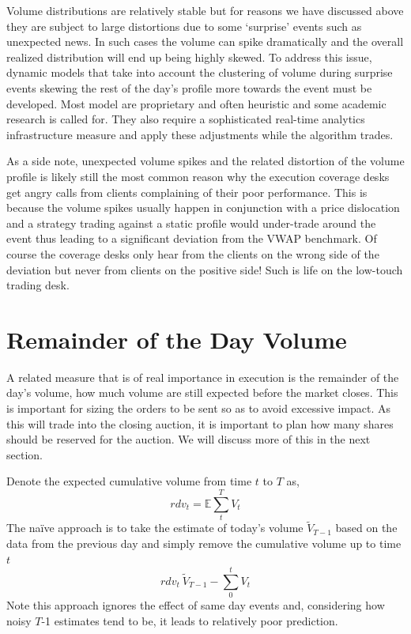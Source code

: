 Volume distributions are relatively stable but for reasons we have discussed above they are subject to large distortions due to some `surprise' events such as unexpected news. In such cases the volume can spike dramatically and the overall realized distribution will end up being highly skewed.  To address this issue, dynamic models that take into account the clustering of volume during surprise events skewing the rest of the day's profile more towards the event must be developed. Most model are proprietary and often heuristic and some academic research is called for. They also require a sophisticated real-time analytics infrastructure measure and apply these adjustments while the algorithm trades.


As a side note, unexpected volume spikes and the related distortion of the volume profile is likely still the most common reason why the execution coverage desks get angry calls from clients complaining of their poor performance. This is because the volume spikes usually happen in conjunction with a price dislocation and a strategy trading against a static profile would under-trade around the event thus leading to a significant deviation from the VWAP benchmark. Of course the coverage desks only hear from the clients on the wrong side of the deviation but never from clients on the positive side! Such is life on the low-touch trading desk.


\section{Remainder of the Day Volume}

A related measure that is of real importance in execution is the remainder of the day's volume, how much volume are still expected before the market closes. This is important for sizing the orders to be sent so as to avoid excessive impact. As this will trade into the closing auction, it is important to plan how many shares should be reserved for the auction. We will discuss more of this in the next section.


Denote the expected cumulative volume from time $t$ to $T$ as,
	\begin{equation}\label{eq:rdv_1}
		rdv_t = \mathbb{E} \sum_t^T V_t
	\end{equation}
The na\"ive approach is to take the estimate of today's volume $\tilde{V}_{T-1}$  based on the data from the previous day and simply remove the cumulative volume up to time $t$
	\begin{equation}\label{eq:rdv_2}
		rdv_t ~   \tilde{V}_{T-1} - \sum_0^t V_t
	\end{equation}
Note this approach ignores the effect of same day events and, considering how noisy $T$-1 estimates tend to be, it leads to relatively poor prediction.


